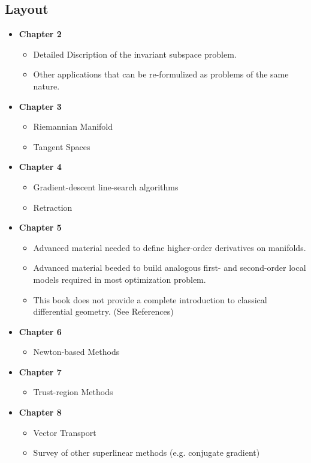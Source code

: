 \documentclass[a4paper]{article}
\begin{document}
\subsection{Layout}
\begin{itemize}
\item \textbf{Chapter 2}

\begin{itemize}
\item Detailed Discription of the invariant subspace problem.
\item Other applications that can be re-formulized as problems of the same nature.
\end{itemize}

\item \textbf{Chapter 3}

\begin{itemize}
\item Riemannian Manifold
\item Tangent Spaces
\end{itemize}

\item \textbf{Chapter 4}

\begin{itemize}
\item Gradient-descent line-search algorithms
\item Retraction
\end{itemize}

\item \textbf{Chapter 5}

\begin{itemize}
\item Advanced material needed to define higher-order derivatives on manifolds.
\item Advanced material beeded to build analogous first- and second-order local models required in most optimization problem.
\item This book does not provide a complete introduction to classical differential geometry. (See References)
\end{itemize}

\item \textbf{Chapter 6}

\begin{itemize}
\item Newton-based Methods
\end{itemize}

\item \textbf{Chapter 7}

\begin{itemize}
\item Trust-region Methods
\end{itemize}

\item \textbf{Chapter 8}

\begin{itemize}
\item Vector Transport
\item Survey of other superlinear methods (e.g. conjugate gradient)
\end{itemize}

\end{itemize}
\end{document}
